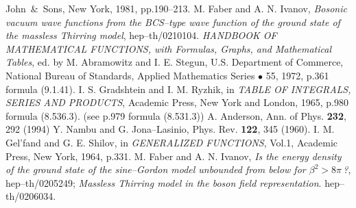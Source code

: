 \documentclass[a4paper,12pt] {article}
\begin{document}
\begin{thebibliography}{9}
John $\,\&\,$ Sons, New York, 1981, pp.190--213.
%
M. Faber and A. N. Ivanov,
{\it Bosonic vacuum wave functions from the BCS--type wave function
of the ground state of the massless Thirring model},
hep--th/0210104.
%
{\it HANDBOOK OF MATHEMATICAL FUNCTIONS, with Formulas,
Graphs, and Mathematical Tables}, ed. by M. Abramowitz and
I. E. Stegun, U.S. Department of Commerce, National Bureau of
Standards, Applied Mathematics Series $\bullet$ 55, 1972,
p.361 formula (9.1.41).
%
I. S. Gradshtein and I. M. Ryzhik,
in {\it TABLE OF INTEGRALS, SERIES AND PRODUCTS},
Academic Press, New York and London, 1965, p.980 formula (8.536.3).
(see \cite{th0210104} p.979 formula (8.531.3))
%
A. Anderson,
Ann. of Phys. {\bf 232}, 292 (1994)
%
Y. Nambu and G. Jona--Lasinio,
Phys. Rev. {\bf 122}, 345 (1960).
%
I. M. Gel'fand and G. E. Shilov,
in {\it GENERALIZED FUNCTIONS}, Vol.1, Academic Press,
New York, 1964, p.331.
%
M. Faber and A. N. Ivanov, 
{\it Is the energy density of the ground state of the sine--Gordon
model unbounded from below for $\beta^2 > 8\pi$\,?}, hep--th/0205249;
{\it Massless Thirring model in the boson field representation}.
hep--th/0206034.
\end{thebibliography}
\end{document}
